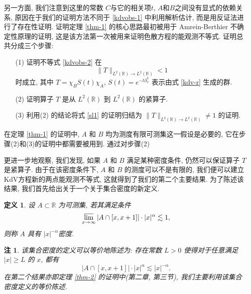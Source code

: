 \documentclass[master]{cugthesis}
\newcommand\R{\ensuremath{\mathbb{R}}}
\newtheorem{remark}{注}
\newtheorem{definition}{定义}[chapter]
\begin{document}
    另一方面, 我们注意到这里的常数 $C$与它的相关项$t$, $A$和$B$之间没有显式的依赖关系, 原因在于我们的证明方法不同于 \eqref{kdvobs-1} 中利用解析估计, 而是用反证法进行了存在性证明. 证明定理 \ref{thm-1} 的核心思路最初\cite{Amrein1977OnSP}被用于 Amrein-Berthier 不确定性原理的证明, 这是该方法第一次被用来证明色散方程的能观测不等式. 证明总共分成三个步骤:
    \begin{enumerate}
        \item[(1)] 证明不等式 \eqref{kdvobs-2} 在
        \begin{equation}
            \|T\|_{L^{2}(\R)\to L^2(\R)}<1\label{sl1}
        \end{equation}
        时成立, 其中 $T=\chi_BS(t)\chi_A$, $S(t)=e^{-t\partial_x^3}$ 表示由式 \eqref{kdv-r} 生成的群.
        \item[(2)] 证明算子 $T$ 是从 $L^2(\R)$ 到 $L^2(\R)$ 的紧算子.
        \item[(3)] 利用(2) 的结论将式 \eqref{sl1} 的证明归结为 $\| T\|_{L^2(\R)\to L^2(\R)}\neq 1$ 的证明.
    \end{enumerate}
    
    在定理 \ref{thm-1} 的证明中, $A$ 和 $B$ 均为测度有限可测集这一假设是必要的, 它在步骤(2)和(3)的证明中都需要被用到. 通过对步骤(2) 
    
    更进一步地观察, 我们发现, 如果 $A$ 和 $B$ 满足某种密度条件, 仍然可以保证算子 $T$ 是紧算子. 由于在该密度条件下, $A$ 和 $B$ 的测度可以不是有限的, 我们便可以建立KdV方程新的两点能观测不等式, 这就得到了我们的第二个主要结果. 为了陈述该结果, 我们首先给出关于一个关于集合密度的新定义.
    \begin{definition}
    设 $A\subset \R$ 为可测集, 若其满足条件
    \begin{equation*}
         \varlimsup_{x\to \infty}|A\cap[x,x+1]|\cdot|x|^{\alpha}\lesssim 1,
    \end{equation*}
    则称 $A$ 具有 $|x|^{-\alpha}$密度.
    \end{definition}
    \begin{remark}\label{rem-1}
    该集合密度的定义可以等价地陈述为: 存在常数 $L>0$ 使得对于任意满足 $|x|\ge L$ 的 $x$, 都有
    \begin{equation*}
        |A\cap [x,x+1]|\cdot |x|^\alpha\lesssim |x|^{-\alpha}.
     \end{equation*}
    在第二个结果亦即定理 \ref{thm-2} 的证明中(第二章, 第三节), 我们主要利用该集合密度定义的等价陈述.
    \end{remark}
    
\end{document}
